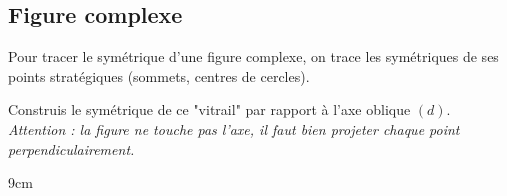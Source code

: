 \documentclass[a4paper]{book}
\begin{document}
\subsection{Figure complexe}
        Pour tracer le symétrique d'une figure complexe, on trace les symétriques de ses points stratégiques (sommets, centres de cercles).
        
    \begin{exemple}
        Construis le symétrique de ce "vitrail" par rapport à l'axe oblique $(d)$. \\
        \textit{Attention : la figure ne touche pas l'axe, il faut bien projeter chaque point perpendiculairement.}
        \begin{ZoneReponse}{9cm} %
        \begin{center}
        \end{center}
        \end{ZoneReponse}
    \end{exemple}
\end{document}
